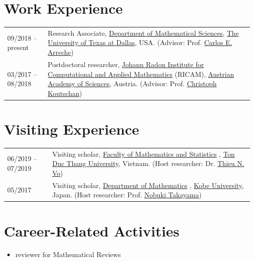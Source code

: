 \documentclass[a4paper,12pt]{article}
\begin{document}
\section*{\Large{Work Experience}}
\begin{tabular}{@{}p{1.4in}p{4in}}
09/2018 -- present    & Research Associate, \href{https://www.utdallas.edu/math/}{Department of Mathematical Sciences}, 
                        \href{https://www.utdallas.edu/}{The University of Texas at Dallas}, USA. 
                        (Advisor: Prof. \href{https://www.utdallas.edu/~arreche/}{Carlos E. Arreche}) \\    
03/2017 -- 08/2018    & Postdoctoral researcher, 
                        \href{https://www.ricam.oeaw.ac.at/}{Johann Radon Institute for Computational and Applied Mathematics} (RICAM),
                        \href{http://www.oeaw.ac.at/en/austrian-academy-of-sciences/}{Austrian Academy of Sciences}, Austria. 
                        (Advisor: Prof. \href{http://www.koutschan.de/}{Christoph Koutschan})\\
\end{tabular}

\section*{\Large{Visiting Experience}}
\begin{tabular}{@{}p{1.4in}p{4.5in}}
06/2019 -- 07/2019               & Visiting scholar, 
                        \href{https://fms.tdtu.edu.vn/}{Faculty of Mathematics and Statistics} ,
                        \href{https://tdtu.edu.vn/}{Ton Duc Thang University}, Vietnam. 
                        (Host researcher: Dr. \href{https://sites.google.com/tdtu.edu.vn/vongocthieu}{Thieu N. Vo})\\
05/2017               & Visiting scholar, 
                        \href{http://www.math.kobe-u.ac.jp/}{Department of Mathematics} ,
                        \href{http://www.kobe-u.ac.jp/en/}{Kobe University}, Japan. 
                        (Host researcher: Prof. \href{http://www.math.kobe-u.ac.jp/home-j/takayama-e.html}{Nobuki Takayama})\\
\end{tabular}

\section*{\Large{Career-Related Activities}}
\begin{itemize}
 \item reviewer for Mathematical Reviews
\end{itemize}
\end{document}
